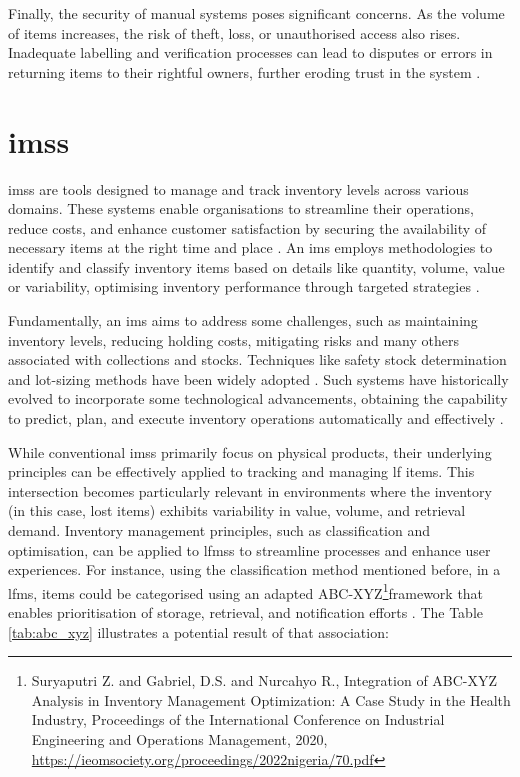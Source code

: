 Finally, the security of manual systems poses significant concerns. As the volume of items increases, the risk of theft, loss, or unauthorised access also rises. Inadequate labelling and verification processes can lead to disputes or errors in returning items to their rightful owners, further eroding trust in the system \cite{Guinard2008}.


\section{\aclp{ims}} \label{sec:ims}

\acp{ims} are tools designed to manage and track inventory levels across various domains. These systems enable organisations to streamline their operations, reduce costs, and enhance customer satisfaction by securing the availability of necessary items at the right time and place \cite{Pauliina2024}. An \ac{ims} employs methodologies to identify and classify inventory items based on details like quantity, volume, value or variability, optimising inventory performance through targeted strategies \cite{Pauliina2024}.

Fundamentally, an \ac{ims} aims to address some challenges, such as maintaining inventory levels, reducing holding costs, mitigating risks and many others associated with collections and stocks. Techniques like safety stock determination and lot-sizing methods have been widely adopted \cite{Prabakaran2023}. Such systems have historically evolved to incorporate some technological advancements, obtaining the capability to predict, plan, and execute inventory operations automatically and effectively \cite{Chebet2019}.

While conventional \acp{ims} primarily focus on physical products, their underlying principles can be effectively applied to tracking and managing \ac{lf} items. This intersection becomes particularly relevant in environments where the inventory (in this case, lost items) exhibits variability in value, volume, and retrieval demand. Inventory management principles, such as classification and optimisation, can be applied to \acp{lfms} to streamline processes and enhance user experiences. For instance, using the classification method mentioned before, in a \ac{lfms}, items could be categorised using an adapted ABC-XYZ\footnote{Suryaputri Z. and Gabriel, D.S. and Nurcahyo R., Integration of ABC-XYZ Analysis in Inventory Management Optimization: A Case Study in the Health Industry, Proceedings of the International Conference on Industrial Engineering and Operations Management, 2020, \url{https://ieomsociety.org/proceedings/2022nigeria/70.pdf}}framework that enables prioritisation of storage, retrieval, and notification efforts \cite{Khobragade2018}. The Table \ref{tab:abc_xyz} illustrates a potential result of that association:

